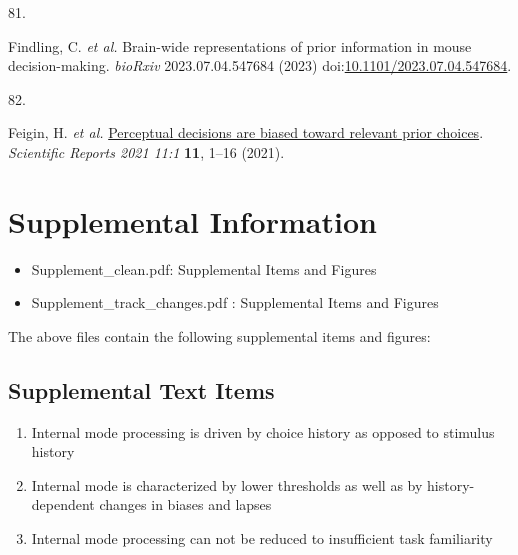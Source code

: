 \documentclass[
]{article}
\newlength{\cslhangindent}
\newlength{\csllabelwidth}
\newlength{\cslentryspacingunit} %
\newenvironment{CSLReferences}[2] %
 {%
  \setlength{\parindent}{0pt}
  \ifodd #1
  \let\oldpar\par
  \def\par{\hangindent=\cslhangindent\oldpar}
  \fi
  \setlength{\parskip}{#2\cslentryspacingunit}
 }%
 {}
\newcommand{\CSLLeftMargin}[1]{\parbox[t]{\csllabelwidth}{#1}}
\newcommand{\CSLRightInline}[1]{\parbox[t]{\linewidth - \csllabelwidth}{#1}\break}
\begin{document}
\begin{CSLReferences}{0}{0}
\leavevmode{}%
\CSLLeftMargin{81. }%
\CSLRightInline{Findling, C. \emph{et al.} Brain-wide representations of
prior information in mouse decision-making. \emph{bioRxiv}
2023.07.04.547684 (2023)
doi:\href{https://doi.org/10.1101/2023.07.04.547684}{10.1101/2023.07.04.547684}.}

\leavevmode{}%
\CSLLeftMargin{82. }%
\CSLRightInline{Feigin, H. \emph{et al.}
\href{https://doi.org/10.1038/s41598-020-80128-0}{Perceptual decisions
are biased toward relevant prior choices}. \emph{Scientific Reports 2021
11:1} \textbf{11}, 1--16 (2021).}

\end{CSLReferences}

\newpage
\hypertarget{Supplemental Information}{%
\section*{Supplemental Information}\label{Supplemental Information}}

\begin{itemize}
\item Supplement\_clean.pdf: Supplemental Items and Figures
\item Supplement\_track\_changes.pdf : Supplemental Items and Figures
\end{itemize}

The above files contain the following supplemental items and figures:

\subsection*{{Supplemental Text Items}\label{Supplemental Text Items}}

\begin{enumerate}
\item Internal mode processing is driven by choice history as opposed to stimulus history
\item Internal mode is characterized by lower thresholds as well as by history-dependent changes in biases and lapses
\item Internal mode processing can not be reduced to insufficient task familiarity
\end{enumerate}
 
\end{document}
